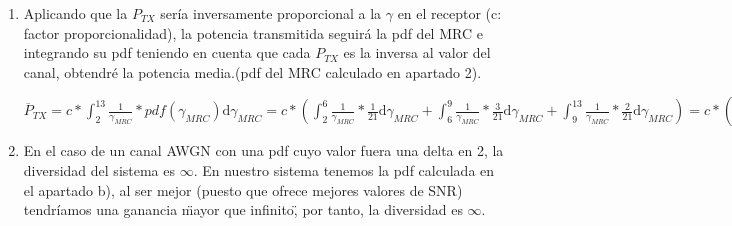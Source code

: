 \documentclass[fleqn,14pt]{article}
\begin{document}
\begin{enumerate}[1.]
   Teniendo $\lambda$, podemos hallar las potencias instantáneas:
   \begin{center}
     $P_1 = \frac{23}{18}-\frac{1}{2} = \boxed{\frac{14}{18} = P_1}$

     $P_2 = \frac{23}{18}-\frac{1}{6} = \boxed{\frac{20}{18} = P_2}$
   \end{center}

   Por tanto, la capacidad media ergódica es:
   \begin{center}
     $\overline{C}_{ERG} = B*[log_2(1+2*\frac{14}{18})*\frac{1}{3}+log_2(1+6*\frac{20}{18})*\frac{2}{3}] = \boxed{2.41*B = \overline{C}}$
   \end{center}

   \item Aplicando que la $P_{TX}$ sería inversamente proporcional a la $\gamma$ en el receptor (c: factor proporcionalidad), la potencia transmitida seguirá la pdf del MRC e integrando su pdf teniendo en cuenta que cada $P_{TX}$ es la inversa al valor del canal, obtendré la potencia media.(pdf del MRC calculado en apartado 2).

   \begin{center}
     $\overline{P}_{TX} = c *\int_{2}^{13}\frac{1}{\gamma_{MRC}}*pdf(\gamma_{MRC}) \mathrm{d}\gamma_{MRC}  = c*(\int_{2}^{6}\frac{1}{\gamma_{MRC}}*\frac{1}{21} \mathrm{d}\gamma_{MRC}+ \int_{6}^{9}\frac{1}{\gamma_{MRC}}*\frac{3}{21} \mathrm{d}\gamma_{MRC} +\int_{9}^{13}\frac{1}{\gamma_{MRC}}*\frac{2}{21} \mathrm{d}\gamma_{MRC}) = c * (\frac{1}{21}*[ln(\gamma_{MRC})]_2^6 +\frac{3}{21}*[ln(\gamma_{MRC})]_6^9+\frac{2}{21}*[ln(\gamma_{MRC})]_9^{13}) = \boxed {c*0.145 = \overline{P}_{TX}} $
   \end{center}

   \item En el caso de un canal AWGN con una pdf cuyo valor fuera una delta en 2, la diversidad del sistema es $\infty$. En nuestro sistema tenemos la pdf calculada en el apartado b), al ser mejor (puesto que ofrece mejores valores de SNR) tendríamos una ganancia \"mayor que infinito\", por tanto, la diversidad es $\infty$.
  \end{enumerate}
\end{document}
